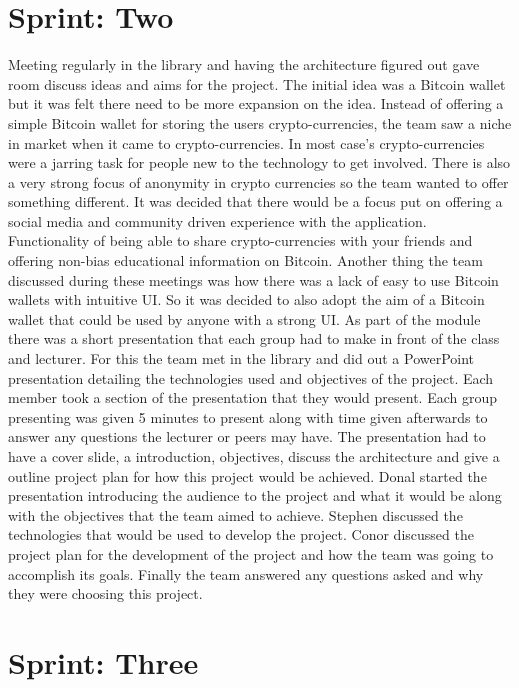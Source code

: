 \section{Sprint: Two}
Meeting regularly in the library and having the architecture figured out gave room discuss ideas and aims for the project. The initial idea was a Bitcoin wallet but it was felt there need to be more expansion on the idea. Instead of offering a simple Bitcoin wallet for storing the users crypto-currencies, the team saw a niche in market when it came to crypto-currencies. In most case's crypto-currencies were a jarring task for people new to the technology to get involved. There is also a very strong focus of anonymity in crypto currencies so the team wanted to offer something different. It was decided that there would be a focus put on offering a social media and community driven experience with the application. Functionality of being able to share crypto-currencies with your friends and offering non-bias educational information on Bitcoin. Another thing the team discussed during these meetings was how there was a lack of easy to use Bitcoin wallets with intuitive UI. So it was decided to also adopt the aim of a Bitcoin wallet that could be used by anyone with a strong UI. As part of the module there was a short presentation that each group had to make in front of the class and lecturer. For this the team met in the library and did out a PowerPoint presentation detailing the technologies used and objectives of the project. Each member took a section of the presentation that they would present. Each group presenting was given 5 minutes to present along with time given afterwards to answer any questions the lecturer or peers may have. The presentation had to have a cover slide, a introduction, objectives, discuss the architecture and give a outline project plan for how this project would be achieved. Donal started the presentation introducing the audience to the project and what it would be along with the objectives that the team aimed to achieve. Stephen discussed the technologies that would be used to develop the project. Conor discussed the project plan for the development of the project and how the team was going to accomplish its goals. Finally the team answered any questions asked and why they were choosing this project. 

\section{Sprint: Three}


